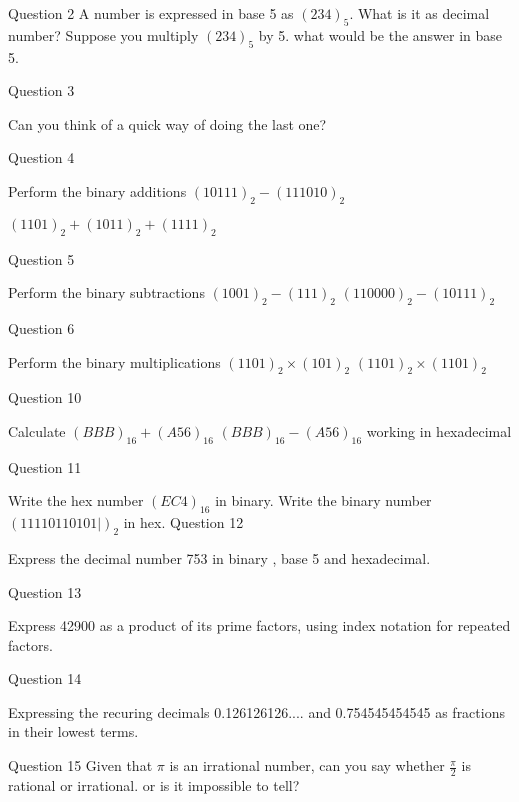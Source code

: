 \documentclass{article}
\begin{document}
Question 2
A number is expressed in base 5 as $(234)_5$. What is it as decimal number?
Suppose you multiply $(234)_5$ by 5. what would be the answer in base 5.

Question 3

Can you think of a quick way of doing the last one?

Question 4


Perform the binary additions
$(10111)_2 -(111010)_2$

$(1101)_2 + (1011)_2 + (1111)_2$

Question 5

Perform the binary subtractions
$(1001)_2 -(111)_2$
$(110000)_2 -(10111)_2$

Question 6

Perform the binary multiplications
$(1101)_2 \times (101)_2$
$(1101)_2 \times (1101)_2$

Question 10

Calculate $(BBB)_{16} + (A56)_{16}$
$(BBB)_{16} - (A56)_{16}$ working in hexadecimal


Question 11

Write the hex number $(EC4)_{16}$ in binary.
Write the binary number $(11110110101|)_2$ in hex.
Question 12

Express the decimal number 753 in binary , base 5 and hexadecimal.

Question 13

Express 42900 as a product of its prime factors, using index notation for repeated factors.

Question 14

Expressing the recuring decimals 0.126126126.... and 0.754545454545 as fractions in their lowest terms.

Question 15
Given that $\pi$ is an irrational number, can you say whether $\frac{\pi}{2}$ is rational or irrational.
or is it impossible to tell?
\end{document}
